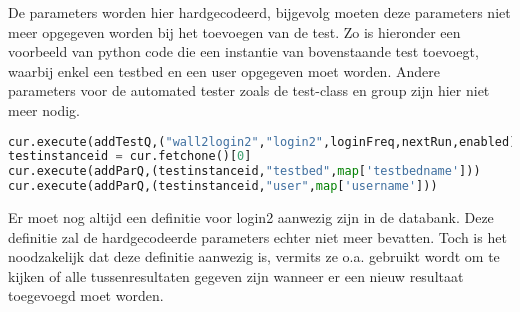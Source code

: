 \npar
De parameters worden hier hardgecodeerd, bijgevolg moeten deze parameters niet meer opgegeven worden bij het toevoegen van de test. Zo is hieronder een voorbeeld van python code die een instantie van bovenstaande test toevoegt, waarbij enkel een testbed en een user opgegeven moet worden. Andere parameters voor de automated tester zoals de test-class en group zijn hier niet meer nodig.
\begin{lstlisting}[language=Python]
cur.execute(addTestQ,("wall2login2","login2",loginFreq,nextRun,enabled))
testinstanceid = cur.fetchone()[0]
cur.execute(addParQ,(testinstanceid,"testbed",map['testbedname']))	
cur.execute(addParQ,(testinstanceid,"user",map['username']))
\end{lstlisting}
\npar
Er moet nog altijd een definitie voor login2 aanwezig zijn in de databank. Deze definitie zal de hardgecodeerde parameters echter niet meer bevatten. Toch is het noodzakelijk dat deze definitie aanwezig is, vermits ze o.a. gebruikt wordt om te kijken of alle tussenresultaten gegeven zijn wanneer er een nieuw resultaat toegevoegd moet worden.

\clearpage
